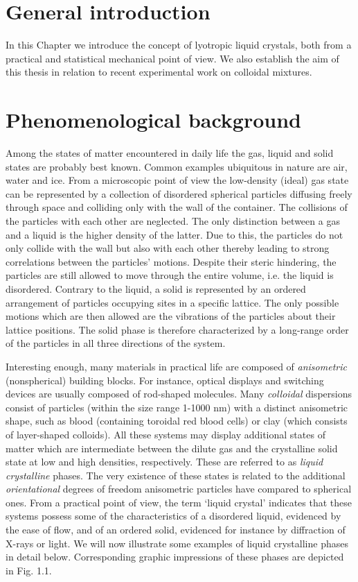 \documentclass[amssymb]{revtex4}
\begin{document}
\section{General introduction}


In this Chapter we introduce the concept of lyotropic liquid crystals, both from
a practical and statistical mechanical point of view.  We also establish
the aim of this thesis in relation to recent experimental work on colloidal mixtures.


\section{Phenomenological background}
Among the states of matter encountered in daily life the gas, liquid and solid states
are probably best known. Common examples ubiquitous in nature are air, water and ice.
From a microscopic point of view the low-density (ideal) gas state can be represented
by a collection of disordered spherical particles diffusing freely through space and colliding only
with the wall of the container. The collisions of the particles with each other are neglected.
The only distinction between a gas and a liquid is the higher density of the latter.
Due to this, the particles do not only collide with the wall but also with each other thereby leading
to strong correlations between the particles' motions. Despite their steric hindering, 
the particles are still allowed to move through the entire volume, i.e. the liquid is disordered.
Contrary to the liquid, a solid is represented by an ordered arrangement 
of particles occupying sites in a specific lattice. The only possible motions which are then allowed are the vibrations 
of the particles about their lattice positions. The solid phase is therefore 
characterized by a long-range order of the particles in  all three
directions of the system.



Interesting enough, many materials in practical life are composed of 
{\em anisometric}  (nonspherical) building blocks. 
For instance, optical displays and switching devices
are usually composed of rod-shaped  molecules.
Many {\em colloidal} dispersions consist
of particles (within the size range 1-1000 nm)  with a distinct
anisometric shape, such as blood (containing toroidal red blood cells) or clay
(which consists of layer-shaped colloids).
All these systems  may display additional states of matter which are intermediate between
the dilute gas and the crystalline solid state at low and high densities, respectively. 
These are referred to as {\em liquid crystalline} phases. The very existence of these states is related to the additional {\em orientational} degrees
of freedom anisometric particles have compared to spherical ones.
From a practical point of view, the term `liquid crystal' indicates that these systems possess some of the characteristics
of a disordered liquid, evidenced by the ease of flow, and of an ordered solid, evidenced
for instance by diffraction of X-rays or light. 
We will now illustrate some examples of liquid crystalline phases in detail below.
Corresponding graphic impressions of these phases are depicted in Fig. 1.1.
\end{document}

